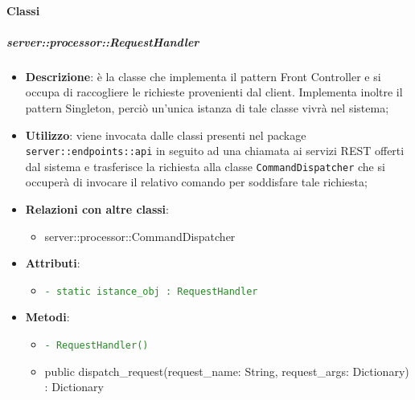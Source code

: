   \paragraph{Classi} %

\subparagraph{server::processor::RequestHandler} %
    \label{subp:bdsm_app_server_processor_requesthandler}
    \begin{itemize}
      \item \textbf{Descrizione}: è la classe che implementa il pattern Front Controller e si occupa di raccogliere le richieste provenienti dal client. Implementa inoltre il pattern Singleton, perciò un'unica istanza di tale classe vivrà nel sistema;
      \item \textbf{Utilizzo}: viene invocata dalle classi presenti nel package \texttt{server::endpoints::api} in seguito ad una chiamata ai servizi REST offerti dal sistema e trasferisce la richiesta alla classe \texttt{CommandDispatcher} che si occuperà di invocare il relativo comando per soddisfare tale richiesta;
      \item \textbf{Relazioni con altre classi}:
        \begin{itemize}
          \item server::processor::CommandDispatcher
        \end{itemize}
      \item \textbf{Attributi}:
          \begin{itemize}
              \item \textcolor{forestgreen}{\texttt{- static istance\_obj : RequestHandler}}
          \end{itemize}
      \item \textbf{Metodi}:
          \begin{itemize}
             \item \textcolor{forestgreen}{\texttt{- RequestHandler()}}
             \item public dispatch\_request(request\_name: String, request\_args: Dictionary) : Dictionary

\end{itemize}
\end{itemize}

